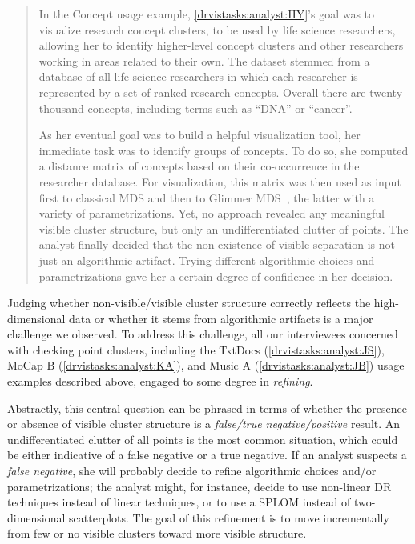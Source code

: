 \begin{quotation}
    In the {\sc Concept} usage example, \ref{drvistasks:analyst:HY}'s goal was to visualize research concept clusters, to be used by life science researchers, allowing her to identify higher-level concept clusters and other researchers working in areas related to their own. 
    The dataset stemmed from a database of all life science researchers in which each researcher is represented by a set of ranked research concepts. 
    Overall there are twenty thousand concepts, including terms such as ``DNA'' or ``cancer''. 

    As her eventual goal was to build a helpful visualization tool, her immediate task was to identify groups of concepts. 
    To do so, she computed a distance matrix of concepts based on their co-occurrence in the researcher database. 
    For visualization, this matrix was then used as input first to classical \ac{MDS} and then to Glimmer \ac{MDS}~\cite{Ingram2009}, the latter with a variety of parametrizations. 
    Yet, no approach revealed any meaningful visible cluster structure, but only an undifferentiated clutter of points.
    The analyst finally decided that the non-existence of visible separation is not just an algorithmic artifact. 
    Trying different algorithmic choices and parametrizations gave her a certain degree of confidence in her decision.
\end{quotation}

Judging whether non-visible/visible cluster structure correctly reflects the high-dimensional data or whether it stems from algorithmic artifacts is a major challenge we observed. 
To address this challenge, all our interviewees concerned with checking point clusters, including the {\sc TxtDocs} (\ref{drvistasks:analyst:JS}), {\sc MoCap B} (\ref{drvistasks:analyst:KA}), and {\sc Music A} (\ref{drvistasks:analyst:JB}) usage examples described above, engaged to some degree in {\it refining}. 

Abstractly, this central question can be phrased in terms of whether the presence or absence of visible cluster structure is a {\it false/true negative/positive} result.
An undifferentiated clutter of all points is the most common situation, which could be either indicative of a false negative or a true negative.
If an analyst suspects a {\it false negative}, she will probably decide to refine algorithmic choices and/or parametrizations; the analyst might, for instance, decide to use non-linear \ac{DR} techniques instead of linear techniques, or to use a \ac{SPLOM} instead of two-dimensional scatterplots. 
The goal of this refinement is to move incrementally from few or no visible clusters toward more visible structure. 

